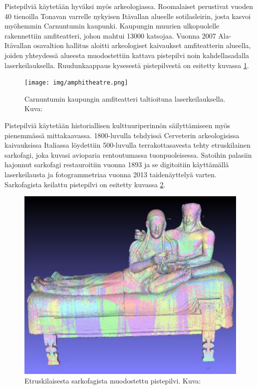 Pistepilviä käytetään hyväksi myös arkeologiassa. Roomalaiset perustivat vuoden 40 tienoilla Tonavan varrelle nykyisen Itävallan alueelle
sotilasleirin, josta kasvoi myöhemmin Carnuntumin kaupunki. Kaupungin muurien ulkopuolelle rakennettiin amfiteatteri, johon mahtui 13000 katsojaa.
Vuonna 2007 Ala-Itävallan osavaltion hallitus aloitti arkeologiset kaivaukset amfiteatterin alueella, joiden yhteydessä alueesta muodostettiin kattava pistepilvi noin kahdellasadalla laserkeilauksella. Ruudunkaappaus kysesestä pistepilvestä on esitetty kuvassa \ref{amfi}. \cite{Carnuntum}

\begin{figure}
    \centering
    \texttt{[image: img/amphitheatre.png]}
    \caption{Carnuntumin kaupungin amfiteatteri taltioituna laserkeilauksella. Kuva: \cite{Amphitheatre}}
    \label{amfi}
\end{figure}

Pistepilviä käytetään historiallisen kulttuuriperinnön säilyttämiseen myös pienemmässä mittakaavassa. 1800-luvulla tehdyissä Cerveterin arkeologisissa kaivauksissa Italiassa löydettiin 500-luvulla terrakottasavesta tehty etruskilainen sarkofagi, joka kuvasi avioparia rentoutumassa tuonpuoleisessa. Satoihin palasiin hajonnut sarkofagi restauroitiin vuonna 1893 ja se digitoitiin käyttämällä laserkeilausta ja fotogrammetriaa vuonna 2013 taidenäyttelyä varten. Sarkofagista keilattu pistepilvi on esitetty kuvassa \ref{sarko}. \cite{sarkofagi} 

\begin{figure}
    \centering
    \includegraphics[width=0.4\paperwidth]{img/sarkofagi.png}
    \caption{Etruskilaisesta sarkofagista muodostettu pistepilvi. Kuva: \cite{sarkofagi}}
    \label{sarko}
\end{figure}

